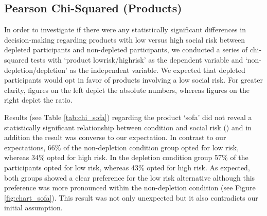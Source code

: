 \subsection{Pearson Chi-Squared (Products)}\label{sec:chi_products}
In order to investigate if there were any statistically significant differences in decision-making regarding products with low versus high social risk between depleted participants and non-depleted participants, we conducted a series of chi-squared tests with ‘product lowrisk/highrisk’ as the dependent variable and ‘non-depletion/depletion’ as the independent variable. We expected that depleted participants would opt in favor of products involving a low social risk. For greater clarity, figures on the left depict the absolute numbers, whereas figures on the right depict the ratio.\par
Results (see Table \ref{tab:chi_sofa}) regarding the product ‘sofa’ did not reveal a statistically significant relationship between condition and social risk () and in addition the result was converse to our expectation. In contrast to our expectations, 66\% of the non-depletion condition group opted for low risk, whereas 34\% opted for high risk. In the depletion condition group 57\% of the participants opted for low risk, whereas 43\% opted for high risk. As expected, both groups showed a clear preference for the low risk alternative although this preference was more pronounced within the non-depletion condition (see Figure \ref{fig:chart_sofa}). This result was not only unexpected but it also contradicts our initial assumption.\par
